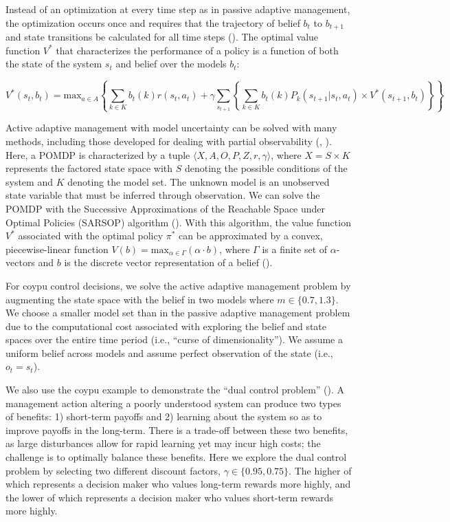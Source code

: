 \documentclass[
  11pt,
  a4paper,
]{article}
\begin{document}
Instead of an optimization at every time step as in passive adaptive management, the optimization occurs once and requires that the trajectory of belief \(b_t\) to \(b_{t+1}\) and state transitions be calculated for all time steps (). The optimal value function \(V^*\) that characterizes the performance of a policy is a function of both the state of the system \(s_t\) and belief over the models \(b_t\):

\[
V^*(s_t,b_t) = \text{max}_{a \in A} \left\{ \sum_{k \in K}b_t(k)r(s_t, a_t) + \gamma \sum_{s_{t+1}} \left\{\sum_{k\in K}b_t(k)P_k(s_{t+1}|s_t, a_t) \times V^*(s_{t+1},b_t)\right\} \right\}
\]

Active adaptive management with model uncertainty can be solved with many methods, including those developed for dealing with partial observability (, ). Here, a POMDP is characterized by a tuple \(〈X, A, O, P, Z, r, \gamma〉\), where \(X = S \times K\) represents the factored state space with \(S\) denoting the possible conditions of the system and \(K\) denoting the model set. The unknown model is an unobserved state variable that must be inferred through observation. We can solve the POMDP with the Successive Approximations of the Reachable Space under Optimal Policies (SARSOP) algorithm (). With this algorithm, the value function \(V^*\) associated with the optimal policy \(\pi^*\) can be approximated by a convex, piecewise-linear function \(V(b) = \text{max}_{\alpha \in \Gamma}(\alpha \cdot b)\), where \(\Gamma\) is a finite set of \(\alpha\)-vectors and \(b\) is the discrete vector representation of a belief ().

For coypu control decisions, we solve the active adaptive management problem by augmenting the state space with the belief in two models where \(m \in \{0.7, 1.3\}\). We choose a smaller model set than in the passive adaptive management problem due to the computational cost associated with exploring the belief and state spaces over the entire time period (i.e., ``curse of dimensionality''). We assume a uniform belief across models and assume perfect observation of the state (i.e., \(o_t = s_t\)).

We also use the coypu example to demonstrate the ``dual control problem'' (). A management action altering a poorly understood system can produce two types of benefits: 1) short-term payoffs and 2) learning about the system so as to improve payoffs in the long-term. There is a trade-off between these two benefits, as large disturbances allow for rapid learning yet may incur high costs; the challenge is to optimally balance these benefits. Here we explore the dual control problem by selecting two different discount factors, \(\gamma \in \{0.95, 0.75 \}\). The higher of which represents a decision maker who values long-term rewards more highly, and the lower of which represents a decision maker who values short-term rewards more highly.
\end{document}
